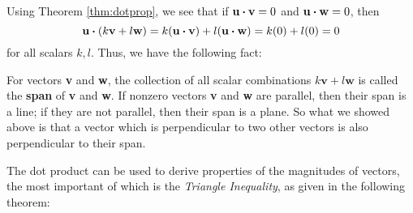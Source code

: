 Using Theorem \ref{thm:dotprop}, we see that if $\textbf{u} \bm{\cdot} \textbf{v} = 0$ and
$\textbf{u} \bm{\cdot} \textbf{w} = 0$, then 
\[\textbf{u} \bm{\cdot} (k\textbf{v} + l\textbf{w}) =
k(\textbf{u} \bm{\cdot} \textbf{v}) + l(\textbf{u} \bm{\cdot} \textbf{w}) = k(0) + l(0) =0\] for all scalars $k, l$.
Thus, we have the following fact:\vspace{2mm}

\vspace{2mm}
For vectors \textbf{v} and \textbf{w}, the collection of all scalar combinations $k\textbf{v} + l\textbf{w}$
is called the \textbf{span} of \textbf{v} and \textbf{w}. If nonzero vectors \textbf{v} and \textbf{w} are
parallel, then their span is a line; if they are not parallel, then their span is a plane. So what we showed above is
that a vector which is perpendicular to two other vectors is also perpendicular to their span.

The dot product can be used to derive properties of the magnitudes of vectors, the most important of which is the
\emph{Triangle Inequality}, as given in the following theorem:

